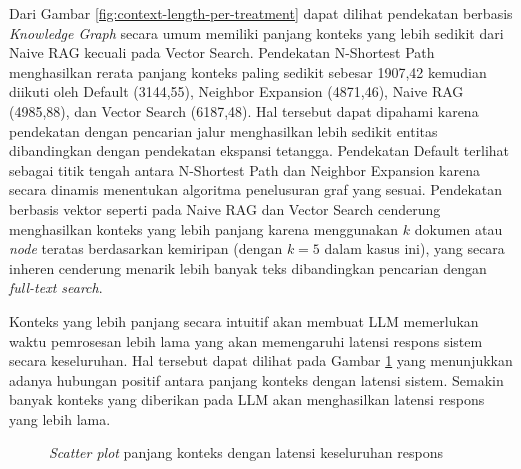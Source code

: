 Dari Gambar \ref{fig:context-length-per-treatment} dapat dilihat pendekatan berbasis \textit{Knowledge Graph} secara umum memiliki panjang konteks yang lebih sedikit dari Naive RAG kecuali pada Vector Search.
Pendekatan N-Shortest Path menghasilkan rerata panjang konteks paling sedikit sebesar 1907,42 kemudian diikuti oleh Default (3144,55), Neighbor Expansion (4871,46), Naive RAG (4985,88), dan Vector Search (6187,48).
Hal tersebut dapat dipahami karena pendekatan dengan pencarian jalur menghasilkan lebih sedikit entitas dibandingkan dengan pendekatan ekspansi tetangga.
Pendekatan Default terlihat sebagai titik tengah antara N-Shortest Path dan Neighbor Expansion karena secara dinamis menentukan algoritma penelusuran graf yang sesuai.
Pendekatan berbasis vektor seperti pada Naive RAG dan Vector Search cenderung menghasilkan konteks yang lebih panjang karena menggunakan $k$ dokumen atau \textit{node} teratas berdasarkan kemiripan (dengan $k=5$ dalam kasus ini), yang secara inheren cenderung menarik lebih banyak teks dibandingkan pencarian dengan \textit{full-text search}.

Konteks yang lebih panjang secara intuitif akan membuat LLM memerlukan waktu pemrosesan lebih lama yang akan memengaruhi latensi respons sistem secara keseluruhan.
Hal tersebut dapat dilihat pada Gambar \ref{fig:context-length-vs-latency} yang menunjukkan adanya hubungan positif antara panjang konteks dengan latensi sistem.
Semakin banyak konteks yang diberikan pada LLM akan menghasilkan latensi respons yang lebih lama.

\begin{figure}[H]
	\centering
	\caption{\textit{Scatter plot} panjang konteks dengan latensi keseluruhan respons}
	\label{fig:context-length-vs-latency}
\end{figure}
